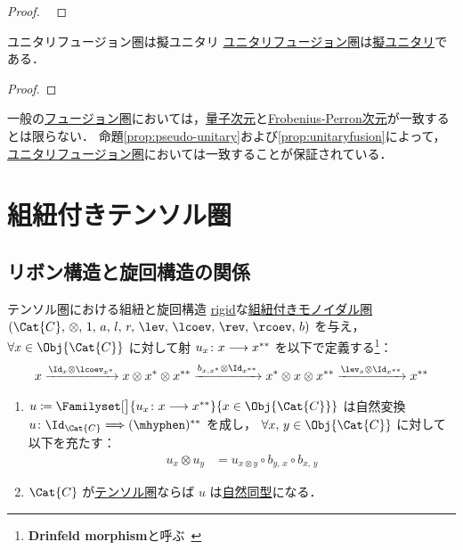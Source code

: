 \documentclass[TQFT_main]{subfiles}
\begin{document}
\begin{proof}
    ~\cite[PROPOSITION 9.5.1., p.284]{etingof2015tensor}
\end{proof}

\begin{myprop}[label=prop:unitaryfusion]{ユニタリフュージョン圏は擬ユニタリ}
    \hyperref[def:UFC]{ユニタリフュージョン圏}は\hyperref[def:pseudo-unitary]{擬ユニタリ}である．
\end{myprop}

\begin{proof}
    
\end{proof}

\begin{marker}
    一般の\hyperref[def:tensorfusion-cat]{フュージョン圏}においては，\hyperref[def:qdim]{量子次元}と\hyperref[def:FPdim]{Frobenius-Perron次元}が一致するとは限らない．
    命題\ref{prop:pseudo-unitary}および\ref{prop:unitaryfusion}によって，\hyperref[def:UFC]{ユニタリフュージョン圏}においては一致することが保証されている．
\end{marker}

\section{組紐付きテンソル圏}

\subsection{リボン構造と旋回構造の関係}

\begin{mylem}[label=lem:braid-ribbon]{テンソル圏における組紐と旋回構造}
    \hyperref[redef:rigid]{rigid}な\hyperref[redef:braided-monoidal]{組紐付きモノイダル圏} $(\Cat{C},\, \otimes,\, 1,\, a,\, l,\, r,\, \lev,\, \lcoev,\, \rev,\, \rcoev,\, b)$ を与え，
    $\forall x \in \Obj{\Cat{C}}$ に対して射 $u_x \colon x \longrightarrow x^{**}$ を以下で定義する\footnote{\textbf{Drinfeld morphism}と呼ぶ~\cite[DEFINITION 8.9.4., p.215]{etingof2015tensor}}：
    \begin{align}
        x \xrightarrow{\Id_x \otimes \lcoev_{x^*}} x \otimes x^* \otimes x^{**} \xrightarrow{b_{x,x^*} \otimes \Id_{x^{**}}} x^* \otimes x \otimes x^{**} \xrightarrow{\lev_x \otimes \Id_{x^{**}}} x^{**}
    \end{align}

    \begin{enumerate}
        \item $u \coloneqq \Familyset[\big]{u_x \colon x \lto x^{**}}{x \in \Obj{\Cat{C}}}$ は自然変換 $u \colon \Id_{\Cat{C}} \Longrightarrow (\mhyphen)^{**}$ を成し，
        $\forall x,\, y \in \Obj{\Cat{C}}$ に対して以下を充たす：
        \begin{align}
            u_x \otimes u_y &= u_{x \otimes y} \circ b_{y,\, x} \circ b_{x,\, y}
        \end{align}
        
        \item $\Cat{C}$ が\hyperref[def:tensorfusion-cat]{テンソル圏}ならば $u$ は\hyperref[def:nat]{自然同型}になる．
    \end{enumerate}
\end{mylem}
\end{document}
